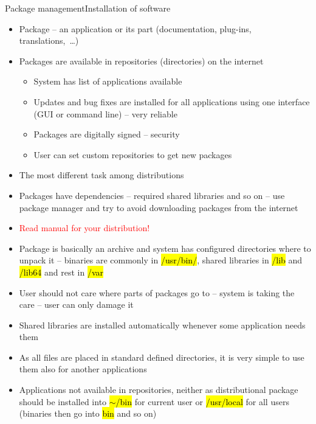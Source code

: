 \documentclass[compress, ucs, xelatex, 11pt, xcolor=svgnames,
  hyperref={
    bookmarks=true,
    unicode=true,
    colorlinks=true,
    pdftitle={Linux, command line and MetaCentrum},
    plainpages=false,
    pdfauthor={Vojtech Zeisek},
    pdfsubject={Course about use of Linux command line, writing shell scripts and using MetaCentrum of CESNET},
    pdfcreator={XeLaTeX},
    pdfkeywords={Linux, GNU, BASH, shell, command line, MetaCentrum},
    linkcolor=Red,
    anchorcolor=Blue,
    citecolor=Purple,
    filecolor=DodgerBlue,
    menucolor=DarkOrchid,
    urlcolor=DeepSkyBlue,
    pdftex},
  url={hyphens, lowtilde} %
  ]{beamer}
\renewcommand{\texttt}[1]{\hl{\ttfamily #1}}
\renewcommand{\alert}[1]{\textcolor{red}{#1}}
\begin{document}
\begin{frame}[allowframebreaks]{Package management}{Installation of software}
  \begin{itemize}
    \item Package -- an application or its part (documentation, plug-ins, translations,~\ldots)
    \item Packages are available in repositories (directories) on the internet
    \begin{itemize}
      \item System has list of applications available
      \item Updates and bug fixes are installed for all applications using one interface (GUI or command line) -- very reliable
      \item Packages are digitally signed -- security
      \item User can set custom repositories to get new packages
    \end{itemize}
    \item The most different task among distributions
    \item Packages have dependencies -- required shared libraries and so on -- use package manager and try to avoid downloading packages from the internet
    \item \alert{Read manual for your distribution!}
    \item Package is basically an archive and system has configured directories where to unpack it -- binaries are commonly in \texttt{/usr/bin/}, shared libraries in \texttt{/lib} and \texttt{/lib64} and rest in \texttt{/var}
    \item User should not care where parts of packages go to -- system is taking the care -- user can only damage it
    \item Shared libraries are installed automatically whenever some application needs them
    \item As all files are placed in standard defined directories, it is very simple to use them also for another applications
    \item Applications not available in repositories, neither as distributional package should be installed into \texttt{$\sim$/bin} for current user or \texttt{/usr/local} for all users (binaries then go into \texttt{bin} and so on)
  \end{itemize}
\end{frame}
\end{document}
